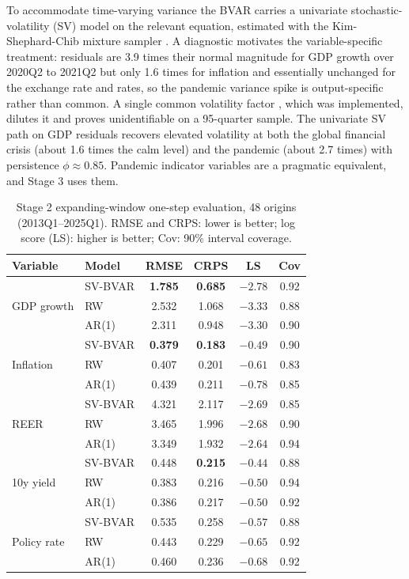 \documentclass[conference]{IEEEtran}
\begin{document}
To accommodate time-varying variance the BVAR carries a univariate stochastic-volatility (SV) model on the relevant equation, estimated with the Kim-Shephard-Chib mixture sampler \cite{ksc1998,primiceri2005}. A diagnostic motivates the variable-specific treatment: residuals are 3.9 times their normal magnitude for GDP growth over 2020Q2 to 2021Q2 but only 1.6 times for inflation and essentially unchanged for the exchange rate and rates, so the pandemic variance spike is output-specific rather than common. A single common volatility factor \cite{ccm2016}, which was implemented, dilutes it and proves unidentifiable on a 95-quarter sample. The univariate SV path on GDP residuals recovers elevated volatility at both the global financial crisis (about 1.6 times the calm level) and the pandemic (about 2.7 times) with persistence $\phi\approx0.85$. Pandemic indicator variables \cite{lenza2022} are a pragmatic equivalent, and Stage 3 uses them.

\begin{table}[t]
\caption{Stage 2 expanding-window one-step evaluation, 48 origins (2013Q1--2025Q1). RMSE and CRPS: lower is better; log score (LS): higher is better; Cov: 90\% interval coverage.}
\label{tab:dens}
\centering
\small
\setlength{\tabcolsep}{4pt}
\begin{tabular}{@{}llcccc@{}}
\toprule
Variable & Model & RMSE & CRPS & LS & Cov \\
\midrule
\multirow{3}{*}{GDP growth}
 & SV-BVAR & \textbf{1.785} & \textbf{0.685} & \textbf{$-2.78$} & 0.92 \\
 & RW      & 2.532 & 1.068 & $-3.33$ & 0.88 \\
 & AR(1)   & 2.311 & 0.948 & $-3.30$ & 0.90 \\
\midrule
\multirow{3}{*}{Inflation}
 & SV-BVAR & \textbf{0.379} & \textbf{0.183} & \textbf{$-0.49$} & 0.90 \\
 & RW      & 0.407 & 0.201 & $-0.61$ & 0.83 \\
 & AR(1)   & 0.439 & 0.211 & $-0.78$ & 0.85 \\
\midrule
\multirow{3}{*}{REER}
 & SV-BVAR & 4.321 & 2.117 & $-2.69$ & 0.85 \\
 & RW      & 3.465 & 1.996 & $-2.68$ & 0.90 \\
 & AR(1)   & 3.349 & 1.932 & $-2.64$ & 0.94 \\
\midrule
\multirow{3}{*}{10y yield}
 & SV-BVAR & 0.448 & \textbf{0.215} & \textbf{$-0.44$} & 0.88 \\
 & RW      & 0.383 & 0.216 & $-0.50$ & 0.94 \\
 & AR(1)   & 0.386 & 0.217 & $-0.50$ & 0.92 \\
\midrule
\multirow{3}{*}{Policy rate}
 & SV-BVAR & 0.535 & 0.258 & \textbf{$-0.57$} & 0.88 \\
 & RW      & 0.443 & 0.229 & $-0.65$ & 0.92 \\
 & AR(1)   & 0.460 & 0.236 & $-0.68$ & 0.92 \\
\bottomrule
\end{tabular}
\end{table}
\end{document}
